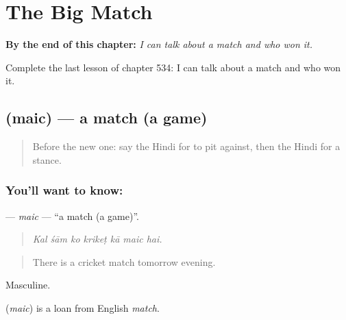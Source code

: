 
\chapter{The Big Match}
\label{ch:hi-the-big-match}

\begin{chapteropening}
\textbf{By the end of this chapter:} \emph{I can talk about a match and who won it.}

Complete the last lesson of chapter 534: I can talk about a match and who won it.
\end{chapteropening}

\section[\texorpdfstring{\hi{मैच} (maic)}{मैच (maic)}]{ (maic) — a match (a game)}

\label{lesson:HI-C534-maic}



\begin{quote}
Before the new one: say the Hindi for to pit against, then the Hindi for a stance.
\end{quote}

\subsection*{You'll want to know: }
\textbf{} — \emph{maic} — \textquotedblleft{}a match (a game)\textquotedblright{}.

\begin{quote}
      
\end{quote}

\begin{quote}
\emph{Kal śām ko krikeṭ kā maic hai.}
\end{quote}

\begin{quote}
There is a cricket match tomorrow evening.
\end{quote}

Masculine.

\begin{cousinweb}
\textbf{} (\emph{maic}) is a loan from English \emph{match}.
\end{cousinweb}

